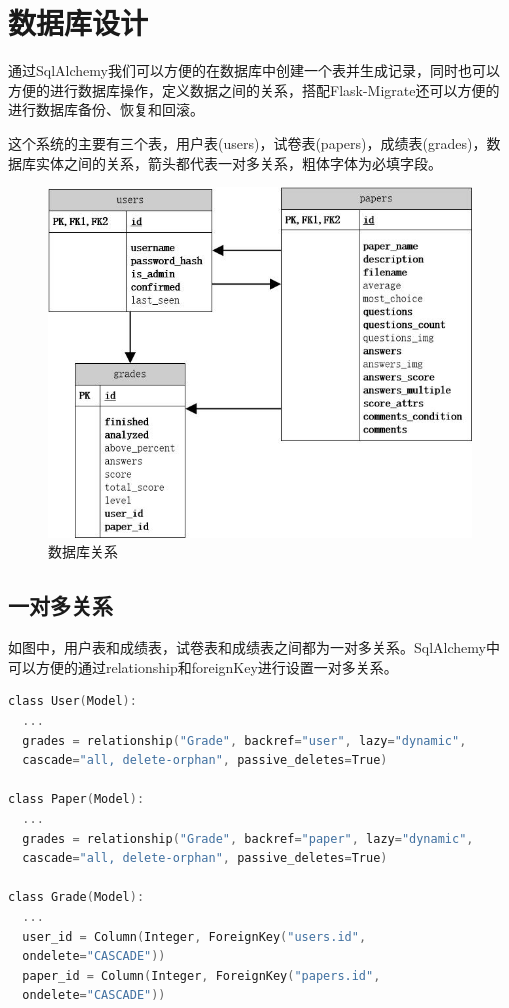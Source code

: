 \section{数据库设计}

通过SqlAlchemy我们可以方便的在数据库中创建一个表并生成记录，同时也可以方便的进行数据库操作，定义数据之间的关系，搭配Flask-Migrate还可以方便的进行数据库备份、恢复和回滚。

这个系统的主要有三个表，用户表(users)，试卷表(papers)，成绩表(grades)，数据库实体之间的关系，箭头都代表一对多关系，粗体字体为必填字段。

\begin{figure}[thbp!]
	\centering
	\includegraphics[width=1.0\linewidth]{figure/entity_relationship}
	\caption{数据库关系}
	\label{fig:entity_relationship}
\end{figure}

\subsection{一对多关系}

如图中，用户表和成绩表，试卷表和成绩表之间都为一对多关系。SqlAlchemy中可以方便的通过relationship和foreignKey进行设置一对多关系。

\begin{lstlisting}[language=C]
class User(Model):
  ...
  grades = relationship("Grade", backref="user", lazy="dynamic",
  cascade="all, delete-orphan", passive_deletes=True)
  
class Paper(Model):
  ...
  grades = relationship("Grade", backref="paper", lazy="dynamic",
  cascade="all, delete-orphan", passive_deletes=True)
  
class Grade(Model):
  ...
  user_id = Column(Integer, ForeignKey("users.id",
  ondelete="CASCADE"))
  paper_id = Column(Integer, ForeignKey("papers.id",
  ondelete="CASCADE"))
\end{lstlisting}

